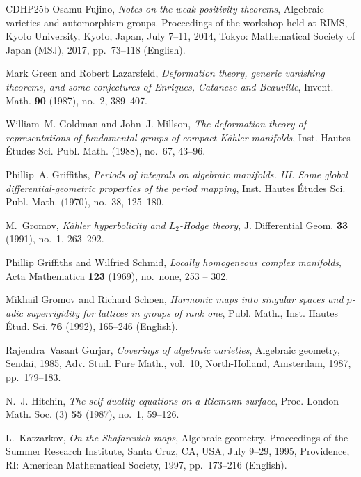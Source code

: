 \documentclass[english]{amsproc}
\theoremstyle{plain}
\theoremstyle{definition}
\theoremstyle{remark}
\theoremstyle{plain}
\numberwithin{equation}{thm} %
\begin{document}
\begin{thebibliography}{CDHP25b}
		Osamu Fujino, \emph{Notes on the weak positivity theorems}, Algebraic varieties
		and automorphism groups. Proceedings of the workshop held at RIMS, Kyoto
		University, Kyoto, Japan, July 7--11, 2014, Tokyo: Mathematical Society of
		Japan (MSJ), 2017, pp.~73--118 (English).
		
		Mark Green and Robert Lazarsfeld, \emph{Deformation theory, generic vanishing
			theorems, and some conjectures of {E}nriques, {C}atanese and {B}eauville},
		Invent. Math. \textbf{90} (1987), no.~2, 389--407. 
		
		William~M. Goldman and John~J. Millson, \emph{The deformation theory of
			representations of fundamental groups of compact {K}\"ahler manifolds}, Inst.
		Hautes \'Etudes Sci. Publ. Math. (1988), no.~67, 43--96. 
		
		Phillip~A. Griffiths, \emph{Periods of integrals on algebraic manifolds. {III}.
			{S}ome global differential-geometric properties of the period mapping}, Inst.
		Hautes \'{E}tudes Sci. Publ. Math. (1970), no.~38, 125--180. 
		
		M.~Gromov, \emph{K\"{a}hler hyperbolicity and {$L_2$}-{H}odge theory}, J.
		Differential Geom. \textbf{33} (1991), no.~1, 263--292. 
		
		Phillip Griffiths and Wilfried Schmid, \emph{{Locally homogeneous complex
				manifolds}}, Acta Mathematica \textbf{123} (1969), no.~none, 253 -- 302.
		
		Mikhail {Gromov} and Richard {Schoen}, \emph{{Harmonic maps into singular
				spaces and $p$-adic superrigidity for lattices in groups of rank one}},
		{Publ. Math., Inst. Hautes \'Etud. Sci.} \textbf{76} (1992), 165--246
		(English).
		
		Rajendra~Vasant Gurjar, \emph{Coverings of algebraic varieties}, Algebraic
		geometry, {S}endai, 1985, Adv. Stud. Pure Math., vol.~10, North-Holland,
		Amsterdam, 1987, pp.~179--183. 
		
		N.~J. Hitchin, \emph{The self-duality equations on a {R}iemann surface}, Proc.
		London Math. Soc. (3) \textbf{55} (1987), no.~1, 59--126. 
		
		L.~Katzarkov, \emph{On the {Shafarevich} maps}, Algebraic geometry. Proceedings
		of the Summer Research Institute, Santa Cruz, CA, USA, July 9--29, 1995,
		Providence, RI: American Mathematical Society, 1997, pp.~173--216 (English).
		

\end{thebibliography}
\end{document}
